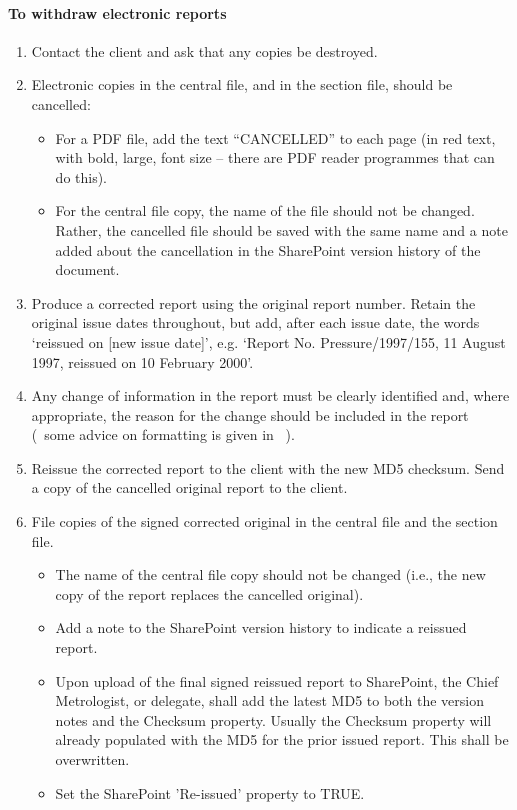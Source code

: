 \paragraph{To withdraw electronic reports}
\begin{enumerate}
\item Contact the client and ask that any copies be destroyed. 

\item Electronic copies in the central file, and in the section file, should be cancelled:
\begin{itemize}
\item For a PDF file, add the text “{\color{red}CANCELLED}” to each page (in red text, with bold, large, font size – there are PDF reader programmes that can do this). 
\item For the central file copy, the name of the file should not be changed. Rather, the cancelled file should be saved with the same name and a note added about the cancellation in the SharePoint version history of the document. 
\end{itemize}

\item Produce a corrected report using the original report number.  Retain the original issue dates throughout, but add, after each issue date, the words `reissued on [new issue date]', e.g. `Report No. Pressure/1997/155, 11 August 1997, reissued on 10 February 2000'.

\item Any change of information in the report must be clearly identified and, where appropriate, the reason for the change should be included in the report (~some advice on formatting is given in \cite[\S\ref*{GRP-ss:reissued_reports}]{MSL_Reporting_Guidelines}~).

\item Reissue the corrected report to the client with the new MD5 checksum. Send a copy of the cancelled original report to the client. 

\item File copies of the signed corrected original in the central file and the section file. 
\begin{itemize}
\item The name of the central file copy should not be changed (i.e., the new copy of the report replaces the cancelled original). 
\item Add a note to the SharePoint version history to indicate a reissued report.
\item Upon upload of the final signed reissued report to SharePoint, the Chief Metrologist, or delegate, shall add the latest MD5 to both the version notes and the Checksum property. Usually the Checksum property will already populated with the MD5 for the prior issued report. This shall be overwritten.
\item Set the SharePoint 'Re-issued' property to TRUE.
\end{itemize}
\end{enumerate}

